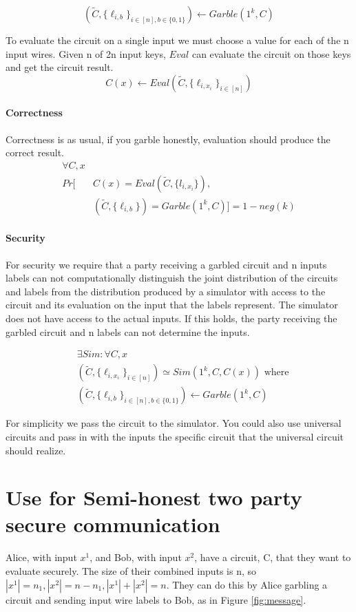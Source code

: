 \documentclass[11pt]{article}
\newcommand{\Prob}{\ensuremath{Pr}\xspace}
\newcommand{\Garble}{\ensuremath{Garble}\xspace}
\newcommand{\Eval}{\ensuremath{Eval}\xspace}
\newcommand{\Sim}{\ensuremath{Sim}\xspace}
\begin{document}
\[
(\tilde{C}, \{\ell_{i,b}\}_{i \in [n], b \in \{0,1\}}) \leftarrow \Garble(1^k, C) 
\]

To evaluate the circuit on a single input we must choose a value for each of the n input wires.
Given n of 2n input keys, \Eval can evaluate the circuit on those keys and get the circuit result.
\[
C(x) \leftarrow \Eval(\tilde{C}, \{\ell_{i, x_i}\}_{i \in [n]}) 
\]

\paragraph{Correctness}
Correctness is as usual, if you garble honestly, evaluation should produce the correct result. 
\begin{align*}
\forall C, x \\
\Prob[ &C(x) = \Eval(\tilde{C}, \{l_{i, x_i}\}), \\
            & (\tilde{C}, \{\ell_{i,b}\}) = \Garble(1^k, C)] = 1 - neg(k)
\end{align*}


\paragraph{Security}
For security we require that a party receiving 
a garbled circuit and n inputs labels 
can not computationally distinguish the joint distribution of the circuits and labels
from the distribution produced by 
a simulator with access to the circuit and its evaluation on the input that the labels represent. 
The simulator does not have access to the actual inputs.
If this holds, the party receiving the garbled circuit and n labels can not determine the inputs.

\begin{align*}
&\exists \Sim : \forall C, x\\
&(\tilde{C}, \{\ell_{i,x_i}\}_{i \in [n]}) \simeq \Sim(1^k, C, C(x)) \text{ where} \\
&(\tilde{C}, \{\ell_{i,b}\}_{i \in [n], b \in \{0,1\}}) \leftarrow \Garble(1^k, C) 
\end{align*}

For simplicity we pass the circuit to the simulator.
You could also use universal circuits and pass 
in with the inputs the specific circuit that the universal circuit should realize. 



\section{Use for Semi-honest two party secure communication}
Alice, with input $x^1$, and Bob, with input $x^2$, have a circuit, C, that they want to evaluate securely. 
The size of their combined inputs is n, so $|x^1| = n_1, |x^2| = n - n_1, |x^1| + |x^2| = n$.
They can do this by Alice garbling a circuit and sending input wire labels to Bob, as in Figure \ref{fig:message}.
\end{document}
